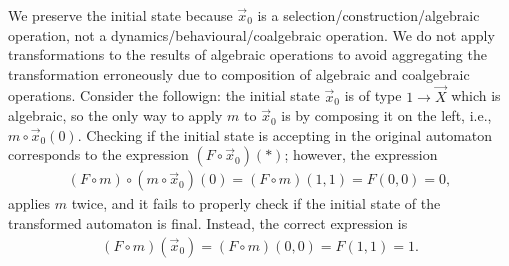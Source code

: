 We preserve the initial state because $\vec{x}_0$ is a selection/construction/algebraic operation, not a dynamics/behavioural/coalgebraic operation. We do not apply transformations to the results of algebraic operations to avoid aggregating the transformation erroneously due to composition of algebraic and coalgebraic operations. Consider the followign: the initial state $\vec{x}_0$ is of type $1\rightarrow\vec{X}$ which is algebraic, so the only way to apply $m$ to $\vec{x}_0$ is by composing it on the left, i.e., $m\circ \vec{x}_0(0)$. Checking if the initial state is accepting in the original automaton corresponds to the expression $(F\circ\vec{x}_0)(*)$; however, the expression
\begin{align*}
    (F\circ m)\circ (m\circ\vec{x}_0)(0)= (F\circ m)(1,1)=F(0,0)=0,
\end{align*}
applies $m$ twice, and it fails to properly check if the initial state of the transformed automaton is final. Instead, the correct expression is 
\begin{align*}
    (F\circ m)(\vec{x}_0)= (F\circ m)(0,0)=F(1,1)=1.
\end{align*}

